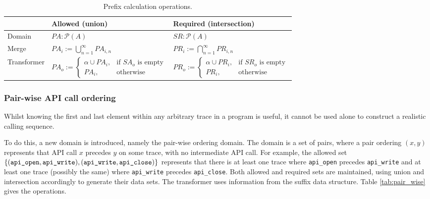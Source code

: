 \documentclass[EPiCempty]{easychair}
\begin{document}
\begin{table}
	\renewcommand{\arraystretch}{1.4}
	\centering
	
	\label{tab:prefix_ops}
	\begin{tabular}{|l|l|l|}
		\hline
		& Allowed (union) &  Required (intersection) \\\hline
		Domain	& $ PA : \mathcal{P}(A)$ &$ SR : \mathcal{P}(A)$ \\
		Merge	& $PA_i := \bigcup_{n=1}^{\infty} PA_{i,n}$ & $PR_i := \bigcap_{n=1}^{\infty} PR_{i,n}$\\
		Transformer	& $PA_o := 
		\begin{cases}
		\alpha \cup PA_i, & \text{if }SA_o\text{ is empty}\\
		PA_i,              & \text{otherwise}
		\end{cases}$ & $PR_o := \begin{cases}
		\alpha \cup PR_i, & \text{if }SR_o\text{ is empty}\\
		PR_i,              & \text{otherwise}
		\end{cases}$ \\\hline
		
	\end{tabular}
	\caption{Prefix calculation operations.}
\end{table}





\subsubsection{Pair-wise API call ordering}
Whilst knowing the first and last element within any arbitrary trace in a program is useful, it cannot be used alone to construct a realistic calling sequence.

To do this, a new domain is introduced, namely the pair-wise ordering domain.  The domain is a set of pairs, where a pair ordering $(x, y)$ represents that API call $x$ precedes $y$ on some trace, with no intermediate  API call.  For example, the allowed set $\{(\text{\texttt{api\_open}}, \text{\texttt{api\_write}}), (\text{\texttt{api\_write}}, \text{\texttt{api\_close}})\}$ represents that there is at least one trace where \texttt{api\_open} precedes \texttt{api\_write} and at least one trace (possibly the same) where \texttt{api\_write} precedes \texttt{api\_close}. Both allowed and required sets are maintained, using union and intersection accordingly to generate their data sets.  The transformer uses information from the suffix data structure.  Table \ref{tab:pair_wise} gives the operations.
\end{document}
